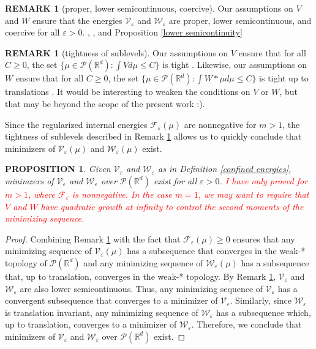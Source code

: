 \documentclass[11pt,leqno]{amsart}
\newtheorem{prop}[thm]{PROPOSITION}
\theoremstyle{definition}
\newtheorem{remark}[thm]{REMARK}
\newcommand{\kcomment}[1]{{\color{Aquamarine}#1}} %
\newcommand{\Rd}{{\mathord{\mathbb R}^d}}
\newcommand{\F}{\mathcal{F}}
\def\P{{\mathcal P}}
\def\e{\varepsilon}
\def\F{\mathcal{F}}
\begin{document}
\begin{remark}[proper, lower semicontinuous, coercive] \label{lsc remark}
\kcomment{Our assumptions on $V$ and $W$ ensure that the energies $\mathcal{V}_\e$ and $\mathcal{W}_\e$ are proper, lower semicontinuous, and coercive for all $\e >0$. \cite[Lemma 5.1.7]{AGS}, \cite[Lemma 2.2]{SimioneSlepcevTopaloglu}, and Proposition \ref{lower semicontinuity}}
\end{remark}

\begin{remark}[tightness of sublevels] \label{sublevel remark}
Our assumptions on $V$ ensure that for all $C \geq 0 $, the set $\{ \mu \in \P(\Rd) : \int V d \mu \leq C \}$ is tight \cite[Remark 5.1.5]{AGS}. Likewise, our assumptions on $W$ ensure that for all $C \geq 0$, the set $\{ \mu \in \P(\Rd) : \int W*\mu d \mu \leq C \}$ is tight up to translations \cite[Theorem 3.1]{SimioneSlepcevTopaloglu}.
\kcomment{It would be interesting to weaken the conditions on $V$ or $W$, but that may be beyond the scope of the present work :).}
\end{remark}

Since the regularized internal energies $\F_\e(\mu)$ are nonnegative for $m > 1$, the tightness of sublevels described in Remark \ref{sublevel remark} allows us to quickly conclude that minimizers of $ \mathcal{V}_\e(\mu) $ and $\mathcal{W}_\e(\mu)$ exist.

\begin{prop}
Given $\mathcal{V}_\e$ and $\mathcal{W}_\e$ as in Definition \ref{confined energies},  minimzers of $\mathcal{V}_\e$  and $\mathcal{W}_\e$ over $\P(\Rd)$ exist for all  $\e >0$. \textcolor{red}{I have only proved for $m >1$, where $\F_\e$ is nonnegative. In the case $m=1$, we may want to require that $V$ and $W$ have quadratic growth at infinity to control the second moments of the minimizing sequence.}
\end{prop}


\begin{proof}
Combining Remark \ref{sublevel remark} with the fact that $\F_\e(\mu) \geq 0$ ensures that any minimizing sequence of $\mathcal{V}_\e(\mu)$ has a subsequence that converges in the weak-* topology of $\P(\Rd)$ and any minimizing sequence of $\mathcal{W}_\e(\mu)$ has a subsequence that, up to translation, converges in the weak-* topology. By Remark \ref{lsc remark}, $\mathcal{V}_\e$ and $\mathcal{W}_\e$ are also lower semicontinuous. Thus, any minimizing sequence of $\mathcal{V}_\e$ has a convergent subsequence that converges to a minimizer of $\mathcal{V}_\e$. Similarly, since $\mathcal{W}_\e$ is translation invariant, any minimizing sequence of $\mathcal{W}_\e$ has a subsequence which, up to translation, converges to a minimizer of $\mathcal{W}_\e$. Therefore, we conclude that minimizers of $\mathcal{V}_\e$ and $\mathcal{W}_\e$ over $\P(\Rd)$ exist.
\end{proof}
\end{document}

